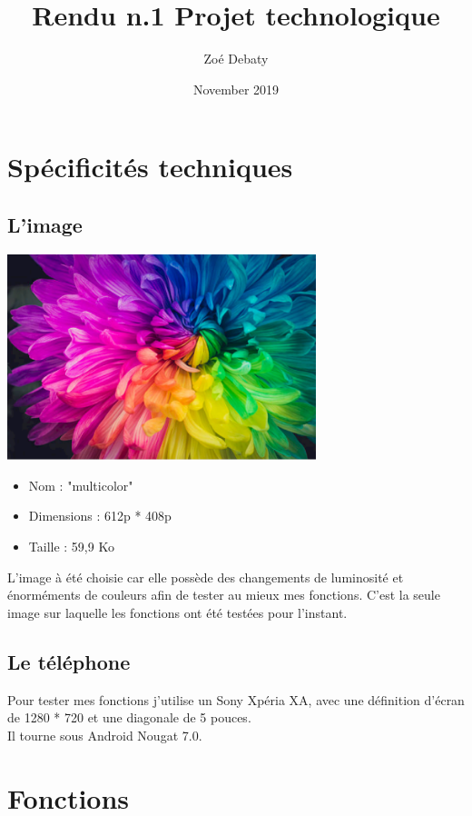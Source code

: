 \documentclass{article}
\title{Rendu n.1 Projet technologique}
\author{Zoé Debaty}
\date{November 2019}
\begin{document}
\maketitle
\tableofcontents 
\newpage

\section{Spécificités techniques}

\subsection{L'image}
\begin{center} 
    \includegraphics[width=9cm]{../multicolor}
    \end{center}

\begin{itemize}
\item Nom : "multicolor"
\item Dimensions : 612p * 408p
\item Taille : 59,9 Ko
\end{itemize}
\medbreak

L'image à été choisie car elle possède des changements de luminosité et énorméments de couleurs afin de tester au mieux mes fonctions.
C'est la seule image sur laquelle les fonctions ont été testées pour l'instant.

\subsection{Le téléphone}
Pour tester mes fonctions j'utilise un Sony Xpéria XA, avec une définition d'écran de 1280 * 720 et une diagonale de 5 pouces.\\
Il tourne sous Android Nougat 7.0.
\newpage

\section{Fonctions}
\end{document}
